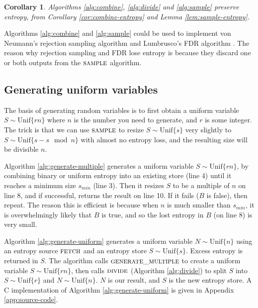 \documentclass[12pt]{article}
\newtheorem{corollary}{Corollary}
\newcommand{\unif}[1]{\mathrm{Unif}\{#1\}}
\begin{document}
\begin{corollary}
    Algorithms \ref{alg:combine}, \ref{alg:divide} and \ref{alg:sample} preserve entropy, from Corollary \ref{cor:combine-entropy} and Lemma \ref{lem:sample-entropy}.
\end{corollary}

Algorithms \ref{alg:combine} and \ref{alg:sample} could be used to implement von Neumann's rejection sampling algorithm \cite{neumann51} and Lumbrusco's FDR algorithm \cite{lumbroso2013optimal}. The reason why rejection sampling and FDR lose entropy is because they discard one or both outputs from the $\textsc{sample}$ algorithm.



\subsection{Generating uniform variables}

The basis of generating random variables is to first obtain a uniform variable $S \sim \unif{rn}$ where $n$ is the number you need to generate, and $r$ is some integer. The trick is that we can use $\textsc{sample}$ to resize $S \sim \unif{s}$ very slightly to $S \sim \unif{s - s \mod n}$ with almost no entropy loss, and the resulting size will be divisible $n$.

Algorithm \ref{alg:generate-multiple} generates a uniform variable $S \sim \unif{rn}$, by combining binary or uniform entropy into an existing store (line 4) until it reaches a minimum size $s_{min}$ (line 3). Then it resizes $S$ to be a multiple of $n$ on line 8, and if successful, returns the result on line 10. If it fails ($B$ is false), then repeat. The reason this is efficient is because when $n$ is much smaller than $s_{min}$, it is overwhelmingly likely that $B$ is true, and so the lost entropy in $B$ (on line 8) is very small.

Algorithm \ref{alg:generate-uniform} generates a uniform variable $N \sim \unif{n}$ using an entropy source $\textsc{fetch}$ and an entropy store $S \sim \unif{s}$. Excess entropy is returned in $S$. The algorithm calls $\textsc{generate\_multiple}$ to create a uniform variable $S \sim \unif{rn}$, then calls $\textsc{divide}$ (Algorithm \ref{alg:divide}) to split $S$ into $S \sim \unif{r}$ and $N \sim \unif{n}$. $N$ is our result, and $S$ is the new entropy store. A C implementation of Algorithm \ref{alg:generate-uniform} is given in Appendix \ref{app:source-code}.
\end{document}
